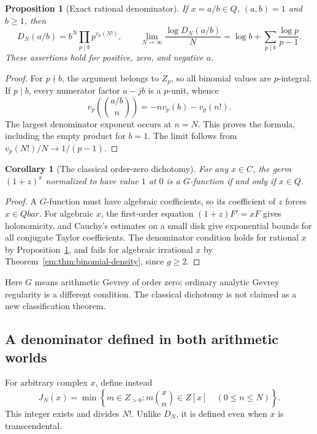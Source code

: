 \documentclass[11pt,a4paper]{article}
\newcommand{\Q}{\mathbb Q}
\newcommand{\Z}{\mathbb Z}
\newcommand{\C}{\mathbb C}
\newcommand{\QB}{\overline{\mathbb Q}}
\newcommand{\Qbar}{\overline{\mathbb Q}}
\newtheorem{proposition}[theorem]{Proposition}
\newtheorem{corollary}[theorem]{Corollary}
\theoremstyle{definition}
\theoremstyle{remark}
\theoremstyle{plain}
\numberwithin{equation}{section}
\def\Qbar{Qbar}\def\QB{Qbar}\def\mathbb#1{#1}%
\begin{document}
\begin{proposition}[Exact rational denominator]
\label{em:prop:binomial-rational}
If $x=a/b\in\Q$, $(a,b)=1$ and $b\ge1$, then
\[
 D_N(a/b)=b^N\prod_{p\mid b}p^{v_p(N!)},\qquad
 \lim_{N\to\infty}\frac{\log D_N(a/b)}N
   =\log b+\sum_{p\mid b}\frac{\log p}{p-1}.
\]
These assertions hold for positive, zero, and negative $a$.
\end{proposition}
\begin{proof}
For $p\nmid b$, the argument belongs to $\Z_p$, so all binomial
values are $p$-integral.  If $p\mid b$, every numerator factor
$a-jb$ is a $p$-unit, whence
\[
 v_p\left(\binom{a/b}{n}\right)=-n v_p(b)-v_p(n!).
\]
The largest denominator exponent occurs at $n=N$.  This proves the
formula, including the empty product for $b=1$.  The limit follows
from $v_p(N!)/N\to1/(p-1)$.
\end{proof}

\begin{corollary}[The classical order-zero dichotomy]
For any $x\in\C$, the germ $(1+z)^x$ normalized to have value $1$ at
$0$ is a $G$-function if and only if $x\in\Q$.
\end{corollary}
\begin{proof}
A $G$-function must have algebraic coefficients, so its coefficient
of $z$ forces $x\in\Qbar$.  For algebraic $x$, the first-order
equation $(1+z)F'=xF$ gives holonomicity, and Cauchy's estimates on
a small disk give exponential bounds for all conjugate Taylor
coefficients.  The denominator condition holds for rational $x$ by
Proposition~\ref{em:prop:binomial-rational}, and fails for algebraic
irrational $x$ by Theorem~\ref{em:thm:binomial-density}, since $g\ge2$.
\end{proof}
Here $G$ means arithmetic Gevrey of order zero; ordinary analytic
Gevrey regularity is a different condition.  The classical dichotomy
is not claimed as a new classification theorem.

\subsection{A denominator defined in both arithmetic worlds}

For arbitrary complex $x$, define instead
\[
 J_N(x)=\min\left\{m\in\Z_{>0}:
        m\binom{x}{n}\in\Z[x]\quad(0\le n\le N)\right\}.
\]
This integer exists and divides $N!$.  Unlike $D_N$, it is defined
even when $x$ is transcendental.
\end{document}
